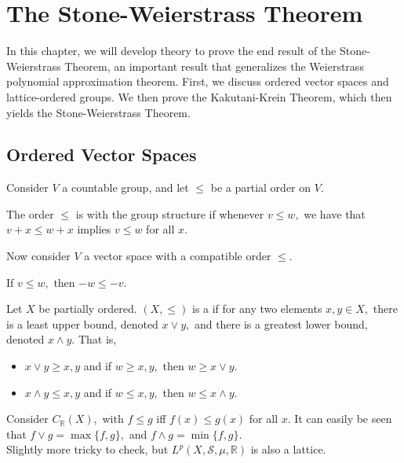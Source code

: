 \chapter{The Stone-Weierstrass Theorem}

In this chapter, we will develop theory to prove the end result of the Stone-Weierstrass Theorem, an important result that generalizes the Weierstrass polynomial approximation theorem. First, we discuss ordered vector spaces and lattice-ordered groups. We then prove the Kakutani-Krein Theorem, which then yields the Stone-Weierstrass Theorem.

\section{Ordered Vector Spaces}
Consider $V$ a countable group, and let $\leq$ be a partial order on $V.$
\begin{defn}
The order $\leq$ is  with the group structure if whenever $v\leq w,$ we have that $v+x\leq w+x$ implies $v\leq w$ for all $x.$
\end{defn}

\noindent Now consider $V$ a vector space with a compatible order $\leq.$
\begin{prop}
If $v\leq w,$ then $-w\leq -v.$ \\
\end{prop}

\begin{defn}
Let $X$ be partially ordered. $(X,\leq)$ is a  if for any two elements $x,y\in X,$ there is a least upper bound, denoted $x\lor y,$ and there is a greatest lower bound, denoted $x\land y.$ That is,
\begin{itemize}
	\item $x\lor y\geq x,y$ and if $w\geq x,y,$ then $w\geq x\lor y.$
	\item $x\land y\leq x,y$ and if $w\leq x,y,$ then $w\leq x\land y.$
	\end{itemize}
\end{defn}

\noindent {} Consider $C_{\mathbb{R}}(X),$ with $f\leq g$ iff $f(x)\leq g(x)$ for all $x.$ It can easily be seen that $f\lor g=\max\{f,g\},$ and $f\land g=\min\{f,g\}.$ \\

\noindent {} Slightly more tricky to check, but $L^p(X,\mathcal{S},\mu,\mathbb{R})$ is also a lattice.

